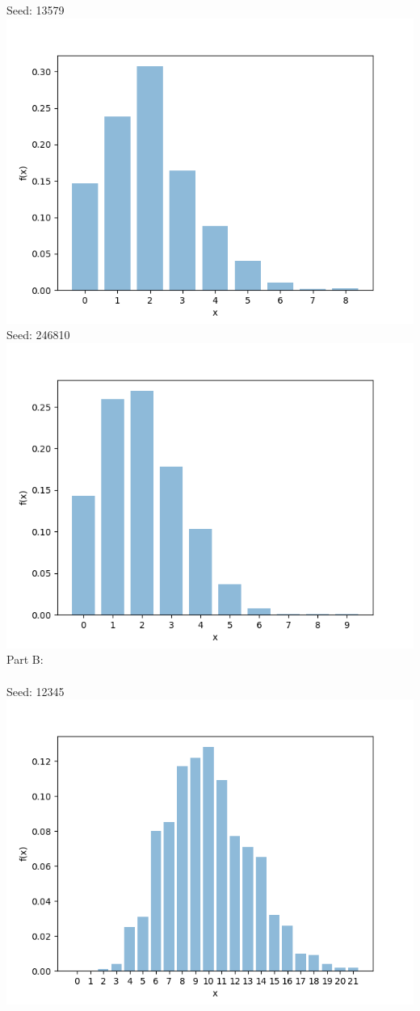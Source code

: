 \newpage
Seed: 13579\\
\includegraphics[scale=1]{Sections/Q2/4_2_a_13579.png}\\
\newpage
Seed: 246810\\
\includegraphics[scale=1]{Sections/Q2/4_2_a_246810.png}\\
\newpage
\noindent Part B:\\\\
Seed: 12345\\
\includegraphics[scale=1]{Sections/Q2/4_2_b_12345.png}\\
